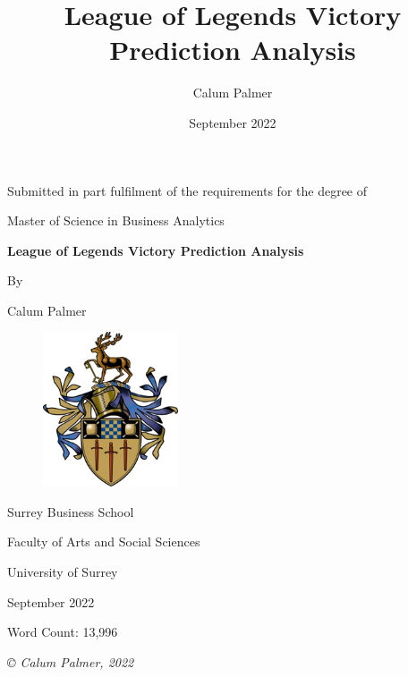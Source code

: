 \documentclass[12pt,a4 paper]{report}
\title{League of Legends Victory Prediction Analysis}
\author{Calum Palmer}
\date{September 2022}
\begin{document}
    \begin{titlepage}
    \centering
        {\large Submitted in part fulfilment of the requirements for the degree of}


        {\Large Master of Science in Business Analytics}

    \vspace{1.5cm}
        {\huge\bfseries League of Legends Victory Prediction Analysis}

    \vspace{1cm}
        {By}

    \vspace{0.5cm}
        {\Large Calum Palmer}

    \vspace{0.25cm}
    \begin{figure}[h]
        \centering
        \includegraphics[width=4cm]{figures/SurreyCrest}
    \end{figure}

    \vspace{0.25cm}
        {\large Surrey Business School}

    \vspace{0.25cm}
        {\large Faculty of Arts and Social Sciences}

    \vspace{0.25cm}
        {\large University of Surrey}

    \vspace{1cm}
        {\large September 2022}

    \vspace{1cm}
        {\large Word Count: 13,996}

    \vfill
        {\itshape © Calum Palmer, 2022}

    \end{titlepage}

    \setcounter{page}{2}
\end{document}
